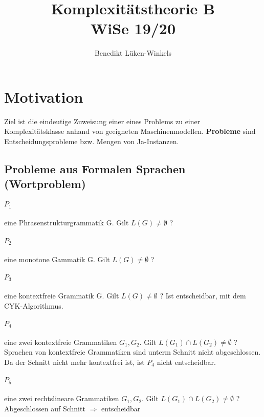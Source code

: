 \documentclass[ngerman]{scrartcl}
\title{Komplexitätstheorie B \\ WiSe 19/20}
\author{Benedikt Lüken-Winkels}
\begin{document}
\maketitle
\tableofcontents
\newpage

\section{Motivation}
Ziel ist die eindeutige Zuweisung einer eines Problems zu einer Komplexitätsklasse anhand von geeigneten Maschinenmodellen. \textbf{Probleme} sind Entscheidungsprobleme bzw. Mengen von Ja-Instanzen. 

\subsection{Probleme aus Formalen Sprachen (Wortproblem)}
\paragraph{$ P_1 $} eine Phrasenstrukturgrammatik G. Gilt $ L(G) \neq \emptyset $ ? 


\paragraph{$ P_2 $} eine monotone Gammatik G. Gilt $ L(G) \neq \emptyset $ ? 


\paragraph{$ P_3 $} eine kontextfreie Grammatik G. Gilt $ L(G) \neq \emptyset $ ? 
Ist entscheidbar, mit dem CYK-Algorithmus.

\paragraph{$ P_4 $} eine zwei kontextfreie Grammatiken $ G_1, G_2 $. Gilt $ L(G_1) \cap L(G_2) \neq \emptyset $ ? 
Sprachen von kontextfreie Grammatiken sind unterm Schnitt nicht abgeschlossen. Da der Schnitt nicht mehr kontextfrei ist, ist $ P_4 $ nicht entscheidbar.

\paragraph{$ P_5 $} eine zwei rechtslineare Grammatiken $ G_1, G_2 $. Gilt $ L(G_1) \cap L(G_2) \neq \emptyset $ ?  
Abgeschlossen auf Schnitt $ \Rightarrow $ entscheidbar
\end{document}
